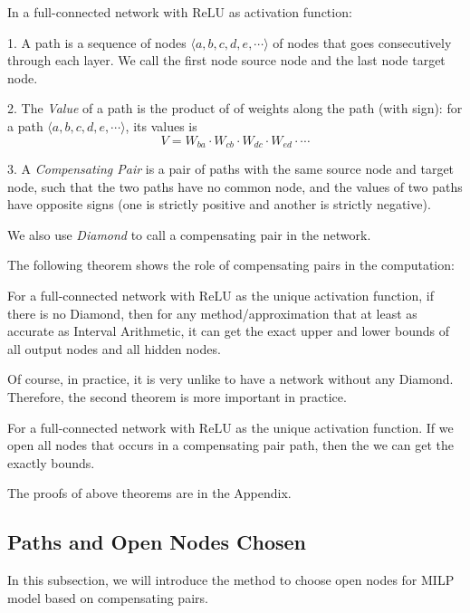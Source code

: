 \documentclass{llncs}
\newcommand{\ReLU}{\mathrm{ReLU}}
\begin{document}
\begin{definition} In a full-connected network with $\ReLU$ as activation function:
	
	1. A path is a sequence of nodes $\langle a,b,c,d,e,\cdots\rangle$ of nodes that goes consecutively through each layer. We call the first node source node and the last node target node.  
	
	2. The \emph{Value} of a path is the product of of weights along the path (with sign): for a path $\langle a,b,c,d,e,\cdots\rangle$, its values is $$V = W_{ba}\cdot W_{cb}\cdot W_{dc}\cdot W_{ed}\cdot \cdots$$
	
	3. A \emph{Compensating Pair} is a pair of paths with the same source node and target node, such that the two paths have no common node, and the values of two paths have opposite signs (one is strictly positive and another is strictly negative).
	
	We also use \emph{Diamond} to call a compensating pair in the network.
\end{definition}


The following theorem shows the role of compensating pairs in the computation:

\begin{theorem}
	For a full-connected network with $\ReLU$ as the unique activation function, if there is no Diamond, then for any method/approximation that at least as accurate as Interval Arithmetic, it can get the exact upper and lower bounds of all output nodes and all hidden nodes.
\end{theorem}

Of course, in practice, it is very unlike to have a network without any Diamond. Therefore, the second theorem is more important in practice.

\begin{theorem}
	For a full-connected network with $\ReLU$ as the unique activation function. If we open all nodes that occurs in a compensating pair path, then the we can get the exactly bounds.
\end{theorem}

The proofs of above theorems are in the Appendix.

\subsection{Paths and Open Nodes Chosen}

In this subsection, we will introduce the method to choose open nodes for MILP model based on compensating pairs.
\end{document}
